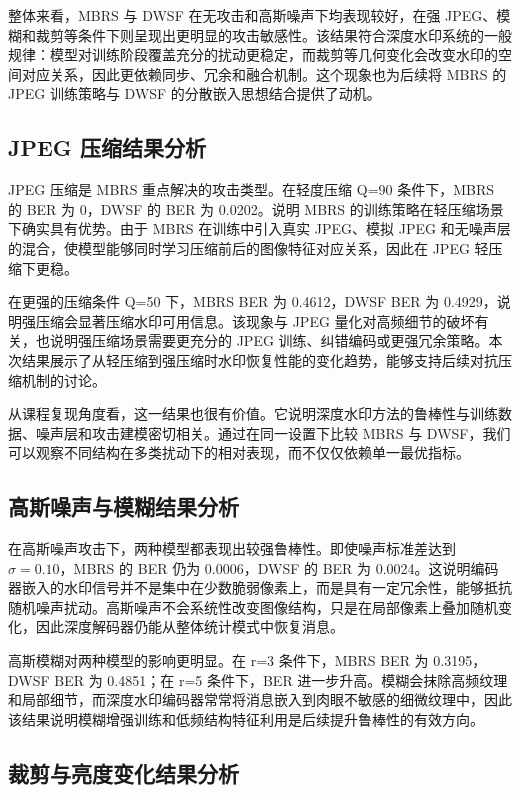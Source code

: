 ﻿\documentclass[UTF8,zihao=5]{ctexart}
\begin{document}
整体来看，MBRS 与 DWSF 在无攻击和高斯噪声下均表现较好，在强 JPEG、模糊和裁剪等条件下则呈现出更明显的攻击敏感性。该结果符合深度水印系统的一般规律：模型对训练阶段覆盖充分的扰动更稳定，而裁剪等几何变化会改变水印的空间对应关系，因此更依赖同步、冗余和融合机制。这个现象也为后续将 MBRS 的 JPEG 训练策略与 DWSF 的分散嵌入思想结合提供了动机。

\subsection{JPEG 压缩结果分析}

JPEG 压缩是 MBRS 重点解决的攻击类型。在轻度压缩 Q=90 条件下，MBRS 的 BER 为 0，DWSF 的 BER 为 0.0202。说明 MBRS 的训练策略在轻压缩场景下确实具有优势。由于 MBRS 在训练中引入真实 JPEG、模拟 JPEG 和无噪声层的混合，使模型能够同时学习压缩前后的图像特征对应关系，因此在 JPEG 轻压缩下更稳。

在更强的压缩条件 Q=50 下，MBRS BER 为 0.4612，DWSF BER 为 0.4929，说明强压缩会显著压缩水印可用信息。该现象与 JPEG 量化对高频细节的破坏有关，也说明强压缩场景需要更充分的 JPEG 训练、纠错编码或更强冗余策略。本次结果展示了从轻压缩到强压缩时水印恢复性能的变化趋势，能够支持后续对抗压缩机制的讨论。

从课程复现角度看，这一结果也很有价值。它说明深度水印方法的鲁棒性与训练数据、噪声层和攻击建模密切相关。通过在同一设置下比较 MBRS 与 DWSF，我们可以观察不同结构在多类扰动下的相对表现，而不仅仅依赖单一最优指标。

\subsection{高斯噪声与模糊结果分析}

在高斯噪声攻击下，两种模型都表现出较强鲁棒性。即使噪声标准差达到 \(\sigma=0.10\)，MBRS 的 BER 仍为 0.0006，DWSF 的 BER 为 0.0024。这说明编码器嵌入的水印信号并不是集中在少数脆弱像素上，而是具有一定冗余性，能够抵抗随机噪声扰动。高斯噪声不会系统性改变图像结构，只是在局部像素上叠加随机变化，因此深度解码器仍能从整体统计模式中恢复消息。

高斯模糊对两种模型的影响更明显。在 r=3 条件下，MBRS BER 为 0.3195，DWSF BER 为 0.4851；在 r=5 条件下，BER 进一步升高。模糊会抹除高频纹理和局部细节，而深度水印编码器常常将消息嵌入到肉眼不敏感的细微纹理中，因此该结果说明模糊增强训练和低频结构特征利用是后续提升鲁棒性的有效方向。

\subsection{裁剪与亮度变化结果分析}
\end{document}
